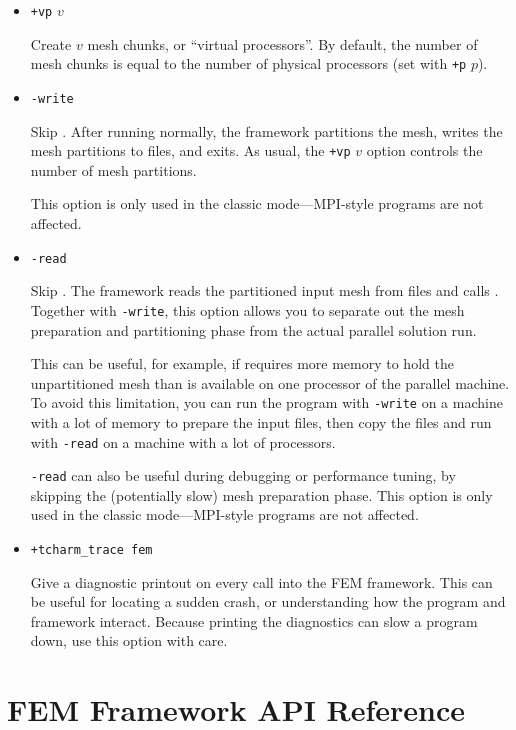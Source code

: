 \documentclass[10pt]{article}
\begin{document}
\begin{itemize}
\item {\tt +vp} $v$  

Create $v$ mesh chunks, or ``virtual processors''.
By default, the number of mesh chunks is equal to the number of 
physical processors (set with {\tt +p} $p$).


\item {\tt -write}

Skip .
After running  normally, the framework partitions the mesh, 
writes the mesh partitions to files, and exits.  As usual, the
{\tt +vp} $v$ option controls the number of mesh partitions.

This option is only used in the classic mode---MPI-style programs
are not affected.


\item {\tt -read}

Skip .
The framework reads the partitioned input mesh from files
and calls .  Together with {\tt -write}, this option
allows you to separate out the mesh preparation and partitioning 
phase from the actual parallel solution run.

This can be useful, for example, if  requires more memory 
to hold the unpartitioned mesh than is available on one processor of 
the parallel machine.  To avoid this limitation, you can run the program
with {\tt -write} on a machine with a lot of memory to prepare the input
files, then copy the files and run with {\tt -read} on a machine with 
a lot of processors.

{\tt -read} can also be useful during debugging or performance tuning, 
by skipping the (potentially slow) mesh preparation phase.
This option is only used in the classic mode---MPI-style programs
are not affected.


\item {\tt +tcharm\_trace fem}

Give a diagnostic printout on every call into the FEM framework.
This can be useful for locating a sudden crash, or understanding
how the program and framework interact.  Because printing the 
diagnostics can slow a program down, use this option with care.

\end{itemize}


\section{FEM Framework API Reference}
\end{document}
